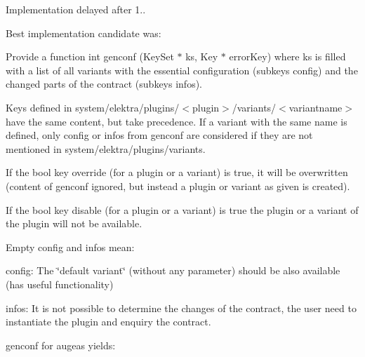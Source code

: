 Implementation delayed after 1..

Best implementation candidate was\+:


\begin{DoxyEnumerate}
\item Provide a function {\ttfamily int genconf (Key\+Set $\ast$ ks, Key $\ast$ error\+Key)} where {\ttfamily ks} is filled with a list of all variants with the essential configuration (subkeys {\ttfamily config}) and the changed parts of the contract (subkeys {\ttfamily infos}).
\item Keys defined in {\ttfamily system/elektra/plugins/$<$plugin$>$/variants/$<$variantname$>$} have the same content, but take precedence. If a variant with the same name is defined, only {\ttfamily config} or {\ttfamily infos} from {\ttfamily genconf} are considered if they are not mentioned in {\ttfamily system/elektra/plugins/variants}.
\item If the bool key {\ttfamily override} (for a plugin or a variant) is true, it will be overwritten (content of {\ttfamily genconf} ignored, but instead a plugin or variant as given is created).
\item If the bool key {\ttfamily disable} (for a plugin or a variant) is true the plugin or a variant of the plugin will not be available.
\item Empty {\ttfamily config} and {\ttfamily infos} mean\+:
\begin{DoxyItemize}
\item {\ttfamily config}\+: The \char`\"{}default variant\char`\"{} (without any parameter) should be also available (has useful functionality)
\item {\ttfamily infos}\+: It is not possible to determine the changes of the contract, the user need to instantiate the plugin and enquiry the contract.
\end{DoxyItemize}
\end{DoxyEnumerate}

{\ttfamily genconf} for augeas yields\+:


\begin{DoxyCode}{0}
\end{DoxyCode}


